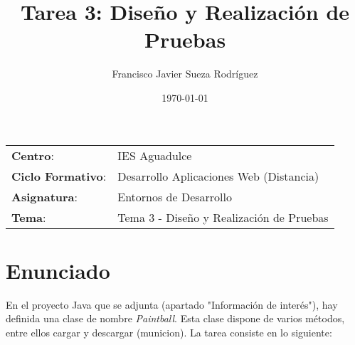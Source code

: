 


\title{
    \vspace{10ex}
    \normalfont \normalsize
    \huge \textbf{Tarea 3: Diseño y Realización de Pruebas}
}
\author{Francisco Javier Sueza Rodríguez}
\date{\normalsize\today}



\maketitle

\thispagestyle{empty}

\vspace{75ex}

\begin{center}
    \begin{tabular}{l l}
        \textbf{Centro}: & IES Aguadulce \\
        \textbf{Ciclo Formativo}: & Desarrollo Aplicaciones Web (Distancia)\\
        \textbf{Asignatura}: & Entornos de Desarrollo\\
       \textbf{Tema}: & Tema 3 - Diseño y Realización de Pruebas\\
    \end{tabular}
\end{center}

\newpage

\tableofcontents

\newpage

\section{Enunciado}
En el proyecto Java que se adjunta (apartado "Información de interés"), hay definida una clase de nombre \textit{Paintball}. Esta clase dispone de varios métodos, entre ellos cargar y descargar (municion). La tarea consiste en lo siguiente:

